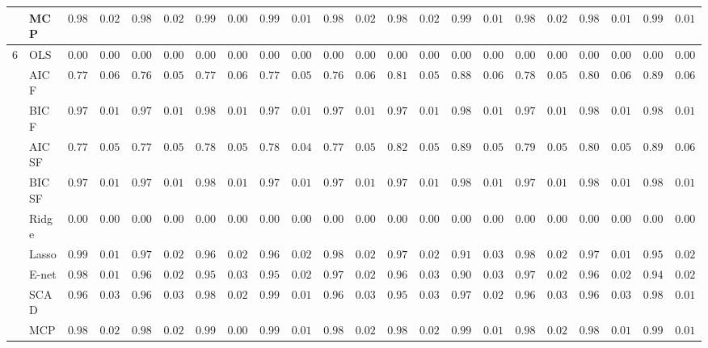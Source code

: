 \begin{tabular}{p{0.2cm}p{1cm}|p{0.6cm}p{0.6cm}|p{0.6cm}p{0.6cm}p{0.6cm}p{0.6cm}p{0.6cm}p{0.6cm}|p{0.6cm}p{0.6cm}p{0.6cm}p{0.6cm}p{0.6cm}p{0.6cm}|p{0.6cm}p{0.6cm}p{0.6cm}p{0.6cm}p{0.6cm}p{0.6cm}}
 & MCP  & $0.9866$ & $0.0200$ & $0.9877$ & $0.0210$ & $0.9959$ & $0.0094$ & $0.9958$ & $0.0144$ & $0.9869$ & $0.0235$ & $0.9849$ & $0.0223$ & $0.9916$ & $0.0135$ & $0.9849$ & $0.0203$ & $0.9881$ & $0.0145$ & $0.9929$ & $0.0130$ \\\hline
6 & OLS  & $0.0000$ & $0.0000$ & $0.0000$ & $0.0000$ & $0.0000$ & $0.0000$ & $0.0000$ & $0.0000$ & $0.0000$ & $0.0000$ & $0.0000$ & $0.0000$ & $0.0000$ & $0.0000$ & $0.0000$ & $0.0000$ & $0.0000$ & $0.0000$ & $0.0000$ & $0.0000$ \\
 & AIC F  & $0.7760$ & $0.0636$ & $0.7662$ & $0.0549$ & $0.7760$ & $0.0629$ & $0.7783$ & $0.0557$ & $0.7682$ & $0.0619$ & $0.8160$ & $0.0554$ & $0.8895$ & $0.0673$ & $0.7869$ & $0.0525$ & $0.8017$ & $0.0635$ & $0.8929$ & $0.0670$ \\
 & BIC F  & $0.9732$ & $0.0155$ & $0.9789$ & $0.0179$ & $0.9805$ & $0.0177$ & $0.9783$ & $0.0150$ & $0.9760$ & $0.0174$ & $0.9793$ & $0.0139$ & $0.9889$ & $0.0121$ & $0.9786$ & $0.0155$ & $0.9833$ & $0.0159$ & $0.9896$ & $0.0121$ \\
 & AIC SF  & $0.7794$ & $0.0571$ & $0.7708$ & $0.0567$ & $0.7851$ & $0.0555$ & $0.7829$ & $0.0488$ & $0.7784$ & $0.0559$ & $0.8212$ & $0.0542$ & $0.8971$ & $0.0589$ & $0.7919$ & $0.0528$ & $0.8065$ & $0.0589$ & $0.8974$ & $0.0603$ \\
 & BIC SF  & $0.9736$ & $0.0148$ & $0.9791$ & $0.0174$ & $0.9807$ & $0.0175$ & $0.9782$ & $0.0151$ & $0.9760$ & $0.0174$ & $0.9795$ & $0.0137$ & $0.9890$ & $0.0122$ & $0.9786$ & $0.0156$ & $0.9834$ & $0.0157$ & $0.9896$ & $0.0121$ \\
 & Ridge  & $0.0000$ & $0.0000$ & $0.0000$ & $0.0000$ & $0.0000$ & $0.0000$ & $0.0000$ & $0.0000$ & $0.0000$ & $0.0000$ & $0.0000$ & $0.0000$ & $0.0000$ & $0.0000$ & $0.0000$ & $0.0000$ & $0.0000$ & $0.0000$ & $0.0000$ & $0.0000$ \\
 & Lasso  & $0.9900$ & $0.0144$ & $0.9769$ & $0.0245$ & $0.9694$ & $0.0268$ & $0.9690$ & $0.0243$ & $0.9864$ & $0.0226$ & $0.9774$ & $0.0291$ & $0.9120$ & $0.0362$ & $0.9833$ & $0.0209$ & $0.9719$ & $0.0193$ & $0.9556$ & $0.0236$ \\
 & E-net  & $0.9854$ & $0.0169$ & $0.9671$ & $0.0289$ & $0.9566$ & $0.0310$ & $0.9568$ & $0.0293$ & $0.9778$ & $0.0286$ & $0.9668$ & $0.0346$ & $0.9011$ & $0.0391$ & $0.9767$ & $0.0247$ & $0.9620$ & $0.0222$ & $0.9465$ & $0.0267$ \\
 & SCAD  & $0.9625$ & $0.0383$ & $0.9676$ & $0.0355$ & $0.9800$ & $0.0231$ & $0.9953$ & $0.0156$ & $0.9605$ & $0.0388$ & $0.9570$ & $0.0375$ & $0.9791$ & $0.0280$ & $0.9631$ & $0.0373$ & $0.9645$ & $0.0304$ & $0.9883$ & $0.0170$ \\
 & MCP  & $0.9866$ & $0.0200$ & $0.9877$ & $0.0210$ & $0.9959$ & $0.0094$ & $0.9958$ & $0.0144$ & $0.9869$ & $0.0235$ & $0.9849$ & $0.0223$ & $0.9916$ & $0.0135$ & $0.9849$ & $0.0203$ & $0.9881$ & $0.0145$ & $0.9929$ & $0.0130$ \\
\hline 
\end{tabular}

